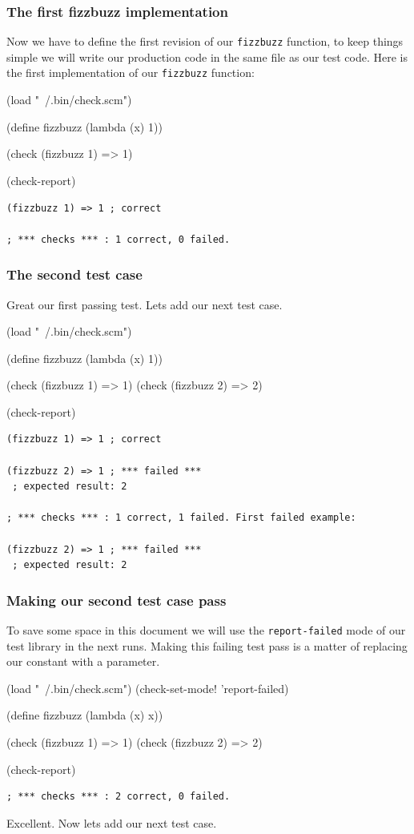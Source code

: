 \documentclass[12pt,a4paper,english,twoside]{article}
\begin{document}
\subsubsection{The first fizzbuzz implementation}
Now we have to define the first revision of our \texttt{fizzbuzz} function, 
to keep things simple we will write our production code in the same file as 
our test code. Here is the first implementation of our \texttt{fizzbuzz} 
function:
\begin{schemecode}
(load "~/.bin/check.scm")

(define fizzbuzz (lambda (x) 1))

(check (fizzbuzz 1) => 1)

(check-report)
\end{schemecode}
\begin{lstlisting}
(fizzbuzz 1) => 1 ; correct

; *** checks *** : 1 correct, 0 failed.
\end{lstlisting}
\subsubsection{The second test case}
Great our first passing test. Lets add our next test case.  
\begin{schemecode}
(load "~/.bin/check.scm")

(define fizzbuzz (lambda (x) 1))

(check (fizzbuzz 1) => 1)
(check (fizzbuzz 2) => 2)

(check-report)
\end{schemecode}
\begin{lstlisting}
(fizzbuzz 1) => 1 ; correct

(fizzbuzz 2) => 1 ; *** failed ***
 ; expected result: 2

; *** checks *** : 1 correct, 1 failed. First failed example:

(fizzbuzz 2) => 1 ; *** failed ***
 ; expected result: 2

\end{lstlisting}
\subsubsection{Making our second test case pass}
To save some space in this document we will use the \texttt{report-failed} 
mode of our test library in the next runs. Making this failing test pass is a 
matter of replacing our constant with a parameter.
\begin{schemecode}
(load "~/.bin/check.scm")
(check-set-mode! 'report-failed)

(define fizzbuzz (lambda (x) x))

(check (fizzbuzz 1) => 1)
(check (fizzbuzz 2) => 2)

(check-report)
\end{schemecode}
\begin{lstlisting}
; *** checks *** : 2 correct, 0 failed.  
\end{lstlisting}
Excellent. Now lets add our next test case.
\end{document}

